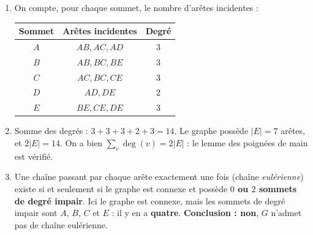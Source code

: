 \documentclass[11pt]{article}
\begin{document}
\begin{corrige}
\begin{enumerate}
\item On compte, pour chaque sommet, le nombre d'arêtes incidentes :
\begin{center}
\begin{tabular}{|c|c|c|}
\hline
\rowcolor{popblueL} Sommet & Arêtes incidentes & Degré \\
\hline
$A$ & $AB, AC, AD$ & $3$ \\
$B$ & $AB, BC, BE$ & $3$ \\
$C$ & $AC, BC, CE$ & $3$ \\
$D$ & $AD, DE$ & $2$ \\
$E$ & $BE, CE, DE$ & $3$ \\
\hline
\end{tabular}
\end{center}
\item Somme des degrés : $3 + 3 + 3 + 2 + 3 = 14$. Le graphe possède $|E| = 7$ arêtes, et $2|E| = 14$. On a bien $\displaystyle\sum_{v} \deg(v) = 2|E|$ : le lemme des poignées de main est vérifié.
\item Une chaîne passant par chaque arête exactement une fois (chaîne \emph{eulérienne}) existe si et seulement si le graphe est connexe et possède \textbf{$0$ ou $2$ sommets de degré impair}. Ici le graphe est connexe, mais les sommets de degré impair sont $A$, $B$, $C$ et $E$ : il y en a \textbf{quatre}. \textbf{Conclusion : non}, $G$ n'admet pas de chaîne eulérienne.
\end{enumerate}
\end{corrige}
\end{document}
